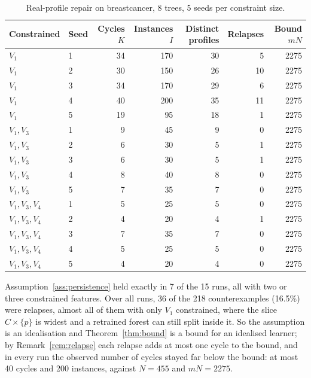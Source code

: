 \documentclass[11pt]{article}
\theoremstyle{definition}
\theoremstyle{remark}
\begin{document}
\begin{table}[ht]
\centering
\begin{tabular}{llrrrrr}
\toprule
Constrained & Seed & Cycles $K$ & Instances $I$ & Distinct profiles & Relapses & Bound $mN$\\
\midrule
$V_1$ & 1 & 34 & 170 & 30 & 5 & 2275\\
$V_1$ & 2 & 30 & 150 & 26 & 10 & 2275\\
$V_1$ & 3 & 34 & 170 & 29 & 6 & 2275\\
$V_1$ & 4 & 40 & 200 & 35 & 11 & 2275\\
$V_1$ & 5 & 19 & 95 & 18 & 1 & 2275\\
\midrule
$V_1,V_3$ & 1 & 9 & 45 & 9 & 0 & 2275\\
$V_1,V_3$ & 2 & 6 & 30 & 5 & 1 & 2275\\
$V_1,V_3$ & 3 & 6 & 30 & 5 & 1 & 2275\\
$V_1,V_3$ & 4 & 8 & 40 & 8 & 0 & 2275\\
$V_1,V_3$ & 5 & 7 & 35 & 7 & 0 & 2275\\
\midrule
$V_1,V_3,V_4$ & 1 & 5 & 25 & 5 & 0 & 2275\\
$V_1,V_3,V_4$ & 2 & 4 & 20 & 4 & 1 & 2275\\
$V_1,V_3,V_4$ & 3 & 7 & 35 & 7 & 0 & 2275\\
$V_1,V_3,V_4$ & 4 & 5 & 25 & 5 & 0 & 2275\\
$V_1,V_3,V_4$ & 5 & 4 & 20 & 4 & 0 & 2275\\
\bottomrule
\end{tabular}
\caption{Real-profile repair on breastcancer, 8 trees, 5 seeds per constraint size.}
\label{tab:observed}
\end{table}

Assumption~\ref{ass:persistence} held exactly in 7 of the 15 runs, all with two or three constrained features. Over all runs, 36 of the 218 counterexamples (16.5\%) were relapses, almost all of them with only $V_1$ constrained, where the slice $C\times\{p\}$ is widest and a retrained forest can still split inside it. So the assumption is an idealisation and Theorem~\ref{thm:bound} is a bound for an idealised learner; by Remark~\ref{rem:relapse} each relapse adds at most one cycle to the bound, and in every run the observed number of cycles stayed far below the bound: at most 40 cycles and 200 instances, against $N=455$ and $mN=2275$.
\end{document}
